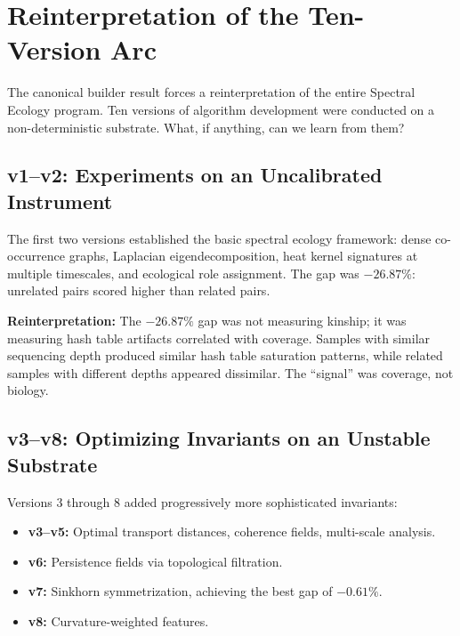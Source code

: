 \documentclass{../yalumba}
\begin{document}
\section{Reinterpretation of the Ten-Version Arc}
\label{sec:reinterpretation}

The canonical builder result forces a reinterpretation of the entire Spectral
Ecology program. Ten versions of algorithm development were conducted on a
non-deterministic substrate. What, if anything, can we learn from them?

\subsection{v1--v2: Experiments on an Uncalibrated Instrument}

The first two versions established the basic spectral ecology framework: dense
co-occurrence graphs, Laplacian eigendecomposition, heat kernel signatures at
multiple timescales, and ecological role assignment. The gap was $-26.87\%$:
unrelated pairs scored higher than related pairs.

\textbf{Reinterpretation:} The $-26.87\%$ gap was not measuring kinship; it was
measuring hash table artifacts correlated with coverage. Samples with similar
sequencing depth produced similar hash table saturation patterns, while related
samples with different depths appeared dissimilar. The ``signal'' was coverage,
not biology.

\subsection{v3--v8: Optimizing Invariants on an Unstable Substrate}

Versions 3 through 8 added progressively more sophisticated invariants:
\begin{itemize}[leftmargin=2em]
  \item \textbf{v3--v5:} Optimal transport distances, coherence fields,
    multi-scale analysis.
  \item \textbf{v6:} Persistence fields via topological filtration.
  \item \textbf{v7:} Sinkhorn symmetrization, achieving the best gap of
    $-0.61\%$.
  \item \textbf{v8:} Curvature-weighted features.
\end{itemize}
\end{document}
